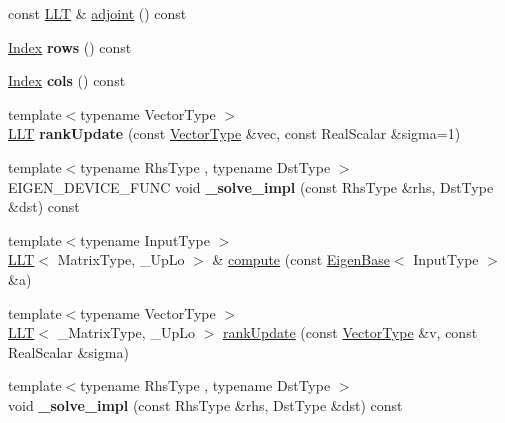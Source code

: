 \begin{DoxyCompactItemize}
const \hyperlink{group___cholesky___module_class_eigen_1_1_l_l_t}{L\+LT} \& \hyperlink{group___cholesky___module_a559aba3a7c41f7fc87ec84327bb72ccd}{adjoint} () const
\item 
\mbox{\label{group___cholesky___module_a964802e4662be3d2982c7ac7e5cb1cc4}} 
\hyperlink{group___cholesky___module_ac7a64274814fa76e8b1e9e945546037f}{Index} {\bfseries rows} () const
\item 
\mbox{\label{group___cholesky___module_a5d42bfeb153842ea6d88e15683b9a41f}} 
\hyperlink{group___cholesky___module_ac7a64274814fa76e8b1e9e945546037f}{Index} {\bfseries cols} () const
\item 
\mbox{\label{group___cholesky___module_aef5a3811432035d8389d6cbc8a13370a}} 
{\footnotesize template$<$typename Vector\+Type $>$ }\\\hyperlink{group___cholesky___module_class_eigen_1_1_l_l_t}{L\+LT} {\bfseries rank\+Update} (const \hyperlink{struct_vector_type}{Vector\+Type} \&vec, const Real\+Scalar \&sigma=1)
\item 
\mbox{\label{group___cholesky___module_a4931c43521d00b110453da8d8f58f428}} 
{\footnotesize template$<$typename Rhs\+Type , typename Dst\+Type $>$ }\\E\+I\+G\+E\+N\+\_\+\+D\+E\+V\+I\+C\+E\+\_\+\+F\+U\+NC void {\bfseries \+\_\+solve\+\_\+impl} (const Rhs\+Type \&rhs, Dst\+Type \&dst) const
\item 
{\footnotesize template$<$typename Input\+Type $>$ }\\\hyperlink{group___cholesky___module_class_eigen_1_1_l_l_t}{L\+LT}$<$ Matrix\+Type, \+\_\+\+Up\+Lo $>$ \& \hyperlink{group___cholesky___module_a2cd165423fe8e1d71066c97bcb488fab}{compute} (const \hyperlink{group___core___module_struct_eigen_1_1_eigen_base}{Eigen\+Base}$<$ Input\+Type $>$ \&a)
\item 
{\footnotesize template$<$typename Vector\+Type $>$ }\\\hyperlink{group___cholesky___module_class_eigen_1_1_l_l_t}{L\+LT}$<$ \+\_\+\+Matrix\+Type, \+\_\+\+Up\+Lo $>$ \hyperlink{group___cholesky___module_ac70d4de31a3626c76c6ea3833af5fa6f}{rank\+Update} (const \hyperlink{struct_vector_type}{Vector\+Type} \&v, const Real\+Scalar \&sigma)
\item 
\mbox{\label{group___cholesky___module_a3536d368add68acb7c9067da5656aaf9}} 
{\footnotesize template$<$typename Rhs\+Type , typename Dst\+Type $>$ }\\void {\bfseries \+\_\+solve\+\_\+impl} (const Rhs\+Type \&rhs, Dst\+Type \&dst) const
\end{DoxyCompactItemize}
